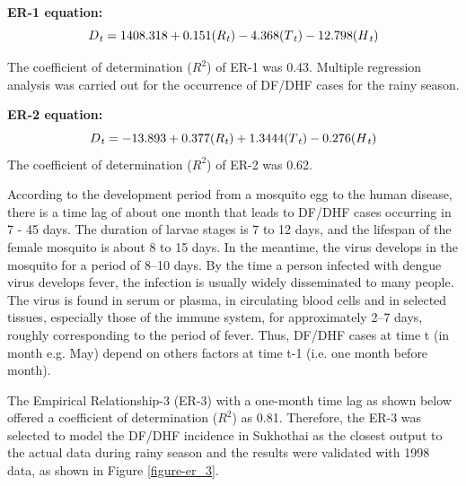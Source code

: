 \documentclass[review]{elsarticle}
\begin{document}

\textbf{ER-1 equation:} 
\begin{equation}
\label{eq:er-1}
D\textsubscript{\textit{t}} =   1408.318 + 0.151(R\textsubscript{\textit{t}}) - 4.368(T\textsubscript{\textit{t}})-12.798(H\textsubscript{\textit{t}} )
\end{equation}

The coefficient of determination ($R^2$) of ER-1 was 0.43.
Multiple regression analysis was carried out for the occurrence of DF/DHF cases for the rainy season.

\textbf{ER-2 equation:} 
\begin{equation}
\label{eq:er-2}
D\textsubscript{\textit{t}} =   -13.893 + 0.377(R\textsubscript{\textit{t}}) + 1.3444(T\textsubscript{\textit{t}}) - 0.276(H\textsubscript{\textit{t}} )
\end{equation}
The coefficient of determination ($R^2$) of ER-2 was 0.62.

According to the development period from a mosquito egg to the human disease, there is a time lag of about one month that leads to DF/DHF cases occurring in 7 - 45 days. The duration of larvae stages is 7 to 12 days, and the lifespan of the female mosquito is about 8 to 15 days. In the meantime, the virus develops in the mosquito for a period of 8$–$10 days. By the time a person infected with dengue virus develops fever, the infection is usually widely disseminated to many people. The virus is found in serum or plasma, in circulating blood cells and in selected tissues, especially those of the immune system, for approximately 2–7 days, roughly corresponding to the period of fever. Thus, DF/DHF cases at time t (in month e.g. May) depend on others factors at time t-1 (i.e. one month before month).

The Empirical Relationship-3 (ER-3) with a one-month time lag as shown below offered a coefficient of determination ($R^2$) as 0.81. Therefore, the ER-3 was selected to model the DF/DHF incidence in Sukhothai as the closest output to the actual data during rainy season and the results were validated with 1998 data, as shown in Figure \ref{figure-er_3}.
\end{document}
